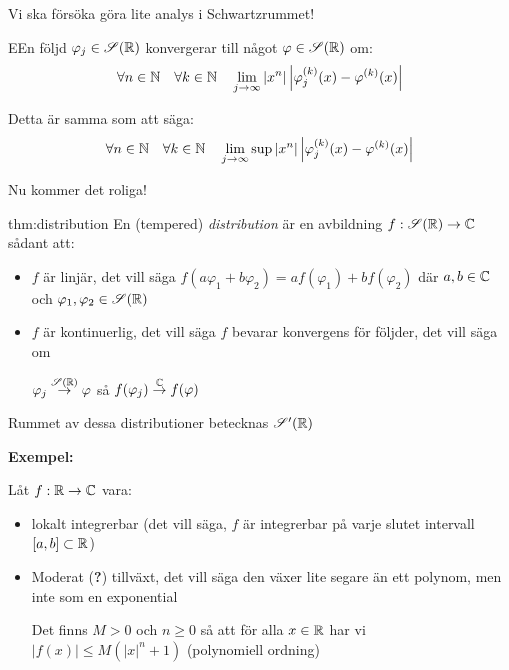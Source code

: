 \par\bigskip
\noindent Vi ska försöka göra lite analys i Schwartzrummet!
\par\bigskip
\begin{theo}
  EEn följd $\varphi_j\in\mathscr{S}(\mathbb{R})$ konvergerar till något $\varphi\in\mathscr{S}(\mathbb{R})$ om:
  \begin{equation*}
    \begin{gathered}
      \forall n\in\mathbb{N}\quad\forall k\in\mathbb{N}\quad\lim_{j\to\infty}\left|x^n\right|\left|\varphi_j^{(k)}(x)-\varphi^{(k)}(x)\right|
    \end{gathered}
  \end{equation*}\par
  \noindent Detta är samma som att säga:
  \begin{equation*}
    \begin{gathered}
      \forall n\in\mathbb{N}\quad\forall k\in\mathbb{N}\quad\lim_{j\to\infty}\sup{\left|x^n\right|\left|\varphi_j^{(k)}(x)-\varphi^{(k)}(x)\right|}
    \end{gathered}
  \end{equation*}
\end{theo}
\par\bigskip
\noindent Nu kommer det roliga!
\par\bigskip
\begin{theo}[Distribution]{thm:distribution}
  En (tempered) \textit{distribution }är en avbildning $f:\mathscr{S}(\mathbb{R})\to\mathbb{C}$ sådant att:\par
  \begin{itemize}
    \item $f$ är linjär, det vill säga $f(a\varphi_1+b\varphi_2) = af(\varphi_1)+bf(\varphi_2)$ där $a,b\in\mathbb{C}$ och $\varphi_1,\varphi_2\in\mathscr{S}(\mathbb{R})$
      \par\bigskip
    \item $f$ är kontinuerlig, det vill säga $f$ bevarar konvergens för följder, det vill säga om\par
      \noindent$\varphi_j\stackrel{\mathscr{S}(\mathbb{R})}{\to}\varphi$ så $f(\varphi_j)\stackrel{\mathbb{C}}{\to}f(\varphi)$
  \end{itemize}
  \par\bigskip
  \noindent Rummet av dessa distributioner betecknas $\mathscr{S}^{\prime}(\mathbb{R})$
\end{theo}
\par\bigskip
\noindent\textbf{Exempel:}\par
\noindent Låt $f:\mathbb{R}\to\mathbb{C}$ vara:\par
\begin{itemize}
  \item lokalt integrerbar (det vill säga, $f$ är integrerbar på varje slutet intervall $[a,b]\subset\mathbb{R}$)
    \par\bigskip
  \item Moderat (\textbf{?}) tillväxt, det vill säga den växer lite segare än ett polynom, men inte som en exponential\par
    \noindent Det finns $M>0$ och $n\geq0$ så att för alla $x\in\mathbb{R}$ har vi $\left|f(x)\right|\leq M(\left|x\right|^n+1)$ (polynomiell ordning)
\end{itemize}
